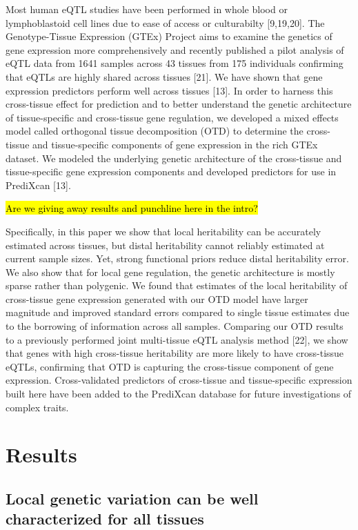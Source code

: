 \documentclass[]{article}
\begin{document}
Most human eQTL studies have been performed in whole blood or
lymphoblastoid cell lines due to ease of access or culturabilty
{[}9,19,20{]}. The Genotype-Tissue Expression (GTEx) Project aims to
examine the genetics of gene expression more comprehensively and
recently published a pilot analysis of eQTL data from 1641 samples
across 43 tissues from 175 individuals confirming that eQTLs are highly
shared across tissues {[}21{]}. We have shown that gene expression
predictors perform well across tissues {[}13{]}. In order to harness
this cross-tissue effect for prediction and to better understand the
genetic architecture of tissue-specific and cross-tissue gene
regulation, we developed a mixed effects model called orthogonal tissue
decomposition (OTD) to determine the cross-tissue and tissue-specific
components of gene expression in the rich GTEx dataset. We modeled the
underlying genetic architecture of the cross-tissue and tissue-specific
gene expression components and developed predictors for use in PrediXcan
{[}13{]}.

\hl{Are we giving away results and punchline here in the intro?}

Specifically, in this paper we show that local heritability can be
accurately estimated across tissues, but distal heritability cannot
reliably estimated at current sample sizes. Yet, strong functional
priors reduce distal heritability error. We also show that for local
gene regulation, the genetic architecture is mostly sparse rather than
polygenic. We found that estimates of the local heritability of
cross-tissue gene expression generated with our OTD model have larger
magnitude and improved standard errors compared to single tissue
estimates due to the borrowing of information across all samples.
Comparing our OTD results to a previously performed joint multi-tissue
eQTL analysis method {[}22{]}, we show that genes with high cross-tissue
heritability are more likely to have cross-tissue eQTLs, confirming that
OTD is capturing the cross-tissue component of gene expression.
Cross-validated predictors of cross-tissue and tissue-specific
expression built here have been added to the PrediXcan database for
future investigations of complex traits.


\section{Results}\label{results}

\subsection{Local genetic variation can be well characterized for all tissues}\label{local-genetic-variation-explains-a-large-proportion-of-gene-expression-variance}
\end{document}
